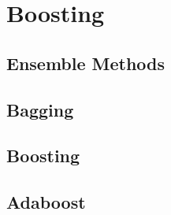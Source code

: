 
\chapter{Boosting}
\label{chapter8}

\section{Ensemble Methods}

\section{Bagging}

\section{Boosting}

\section{Adaboost}